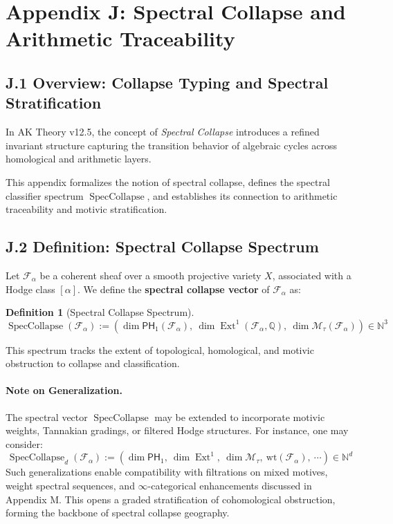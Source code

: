 \documentclass[11pt]{article}
\newtheorem{definition}[theorem]{Definition}
\DeclareMathOperator{\Ext}{Ext}
\begin{document}
\section*{Appendix J: Spectral Collapse and Arithmetic Traceability}

\subsection*{J.1 Overview: Collapse Typing and Spectral Stratification}

In AK Theory v12.5, the concept of \emph{Spectral Collapse} introduces a refined invariant structure capturing the transition behavior of algebraic cycles across homological and arithmetic layers.

This appendix formalizes the notion of spectral collapse, defines the spectral classifier spectrum $\operatorname{SpecCollapse}$, and establishes its connection to arithmetic traceability and motivic stratification.

\subsection*{J.2 Definition: Spectral Collapse Spectrum}

Let $\mathcal{F}_\alpha$ be a coherent sheaf over a smooth projective variety $X$, associated with a Hodge class $[\alpha]$. We define the \textbf{spectral collapse vector} of $\mathcal{F}_\alpha$ as:

\begin{definition}[Spectral Collapse Spectrum]
\[
\operatorname{SpecCollapse}(\mathcal{F}_\alpha) := \left( \dim \mathsf{PH}_1(\mathcal{F}_\alpha), \ \dim \Ext^1(\mathcal{F}_\alpha, \mathbb{Q}), \ \dim \mathcal{M}_\tau(\mathcal{F}_\alpha) \right) \in \mathbb{N}^3
\]
\end{definition}

This spectrum tracks the extent of topological, homological, and motivic obstruction to collapse and classification.

\paragraph{Note on Generalization.}
The spectral vector $\operatorname{SpecCollapse}$ may be extended to incorporate motivic weights, Tannakian gradings, or filtered Hodge structures. For instance, one may consider:
\[
\operatorname{SpecCollapse}_d(\mathcal{F}_\alpha) := \left( \dim \mathsf{PH}_1, \ \dim \Ext^1, \ \dim \mathcal{M}_\tau, \ \mathrm{wt}(\mathcal{F}_\alpha), \ \cdots \right) \in \mathbb{N}^d
\]
Such generalizations enable compatibility with filtrations on mixed motives, weight spectral sequences, and $\infty$-categorical enhancements discussed in Appendix M. This opens a graded stratification of cohomological obstruction, forming the backbone of spectral collapse geography.
\end{document}
